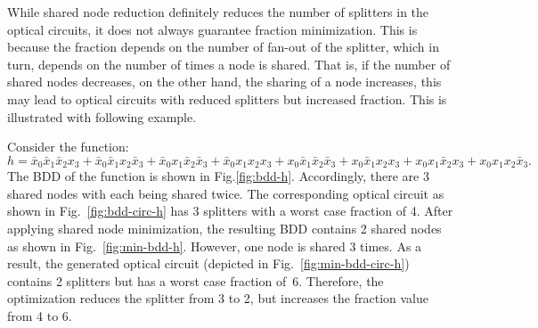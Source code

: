 \documentclass[10pt,letterpaper,twoside,openright]{book}
\begin{document}
While shared node reduction definitely reduces the number of splitters in the optical circuits, it does not always guarantee fraction minimization. This is because the fraction depends on the number of fan-out of the splitter, which in turn, depends on the number of times a node is shared. That is, if the number of shared nodes decreases, on the other hand, the sharing of a node increases, this may lead to optical circuits with reduced splitters but increased fraction. This is illustrated with following example.
   
\begin{example}\label{ex:increase_in_fraction}
Consider the function:
$$h=\bar{x}_0\bar{x}_1\bar{x}_2x_3+\bar{x}_0\bar{x}_1x_2\bar{x}_3+\bar{x}_0x_1
\bar{x}_2\bar{x}_3+\bar{x}_0x_1x_2x_3+x_0\bar{x}_1\bar{x}_2\bar{x}_3+x_0\bar{x}_1x_2x_3+
x_0x_1\bar{x}_2x_3 +x_0x_1x_2\bar{x}_3.$$
The BDD of the function is shown in Fig.\ref{fig:bdd-h}. Accordingly, there are 3 shared nodes with each being shared twice. The corresponding optical circuit as shown in Fig.~\ref{fig:bdd-circ-h} has 3 splitters with a worst case fraction of 4. After applying shared node minimization, the resulting BDD contains 2 shared nodes as shown in Fig.~\ref{fig:min-bdd-h}. However, one node is shared 3 times. As a result, the generated optical circuit (depicted in Fig.~\ref{fig:min-bdd-circ-h}) contains 2 splitters but has a worst case fraction of~6. Therefore, the optimization reduces the splitter from 3 to 2, but increases the fraction value from 4 to 6.
\end{example}
\end{document}
